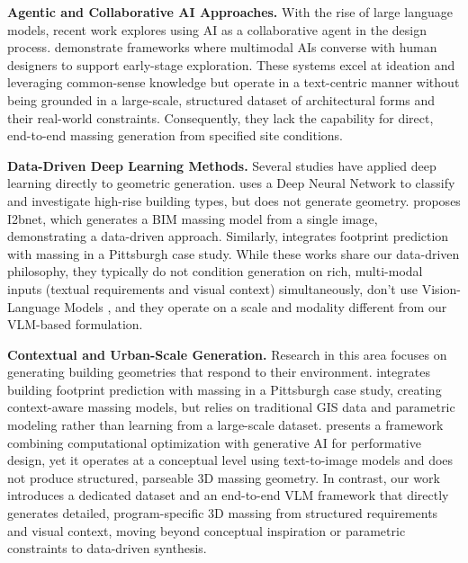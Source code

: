 \textbf{Agentic and Collaborative AI Approaches.} With the rise of large language models, recent work explores using AI as a collaborative agent in the design process. \cite{3, 4} demonstrate frameworks where multimodal AIs converse with human designers to support early-stage exploration. These systems excel at ideation and leveraging common-sense knowledge but operate in a text-centric manner without being grounded in a large-scale, structured dataset of architectural forms and their real-world constraints. Consequently, they lack the capability for direct, end-to-end massing generation from specified site conditions.

\textbf{Data-Driven Deep Learning Methods.} Several studies have applied deep learning directly to geometric generation. \cite{5} uses a Deep Neural Network to classify and investigate high-rise building types, but does not generate geometry. \cite{6} proposes I2bnet, which generates a BIM massing model from a single image, demonstrating a data-driven approach. Similarly, \cite{7} integrates footprint prediction with massing in a Pittsburgh case study. While these works share our data-driven philosophy, they typically do not condition generation on rich, multi-modal inputs (textual requirements and visual context) simultaneously, don't use Vision-Language Models \cite{vlm}, and they operate on a scale and modality different from our VLM-based formulation.

\textbf{Contextual and Urban-Scale Generation.} Research in this area focuses on generating building geometries that respond to their environment. \cite{7} integrates building footprint prediction with massing in a Pittsburgh case study, creating context-aware massing models, but relies on traditional GIS data and parametric modeling rather than learning from a large-scale dataset. \cite{4} presents a framework combining computational optimization with generative AI for performative design, yet it operates at a conceptual level using text-to-image models and does not produce structured, parseable 3D massing geometry. In contrast, our work introduces a dedicated dataset and an end-to-end VLM framework that directly generates detailed, program-specific 3D massing from structured requirements and visual context, moving beyond conceptual inspiration or parametric constraints to data-driven synthesis.
